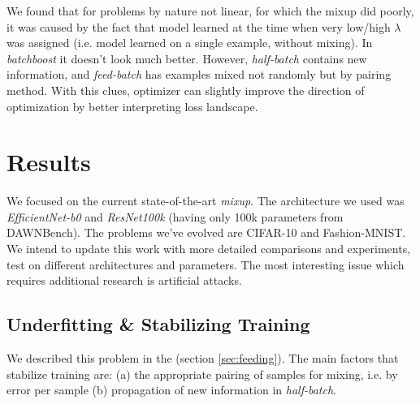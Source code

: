 \documentclass{article}
\begin{document}
We found that for problems by nature not linear, for which the mixup did poorly,
it was caused by the fact that model learned at the time when very low/high
$\lambda$ was assigned (i.e. model learned on a single example, without mixing).
%
In \emph{batchboost} it doesn't look much better. However, \emph{half-batch}
contains new information, and \emph{feed-batch} has examples mixed not randomly but
by pairing method. With this clues, optimizer can slightly improve the direction of
optimization by better interpreting loss landscape.

\section{Results}
\label{sec:results}

We focused on the current state-of-the-art \emph{mixup}. The architecture we
used was \emph{EfficientNet-b0}\cite{tan2019efficientnet} and
\emph{ResNet100k}\cite{DBLP:journals/corr/HeZRS15} (having only 100k
parameters from DAWNBench\cite{coleman2017dawnbench}). The problems we've evolved are CIFAR-10 and
Fashion-MNIST.
%
We intend to update this work with more detailed comparisons and experiments,
test on different architectures and parameters. The most interesting
issue which requires additional research is artificial attacks.

\subsection{Underfitting \& Stabilizing Training}
\label{sec:under}

We described this problem in the (section \ref{sec:feeding}). The main factors
that stabilize training are: (a) the appropriate pairing of samples for mixing,
i.e. by error per sample (b) propagation of new information in \emph{half-batch}.
\end{document}
